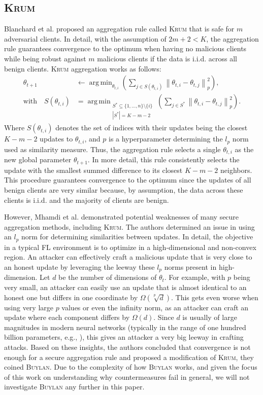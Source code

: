 \documentclass[conference]{IEEEtran}
\DeclareMathOperator*{\argmin}{arg\,min}
\newcommand{\norm}[1]{\left\lVert#1\right\rVert}
\begin{document}
\subsection{\textsc{Krum}}
Blanchard et al. \cite{Blanchard2017} proposed an aggregation rule called \textsc{Krum} that is safe for $m$ adversarial clients. In detail, with the assumption of $2m +2 < K$, the aggregation rule guarantees convergence to the optimum when having no malicious clients while being robust against $m$ malicious clients if the data is i.i.d. across all benign clients.
\textsc{Krum} aggregation works as follows:
\begin{align}
    \theta_{t+1} &\leftarrow \argmin_{\theta_{t,i}}(\sum_{j\in S(\theta_{t,i})}\norm{\theta_{t,i} - \theta_{t,j}}^2_p), \\
    \text{with} \quad S(\theta_{t,i}) &= \argmin_{\substack{S^* \subseteq \{1, \ldots, n\} \setminus \{i\}\\|S^*| = K-m-2}}(\sum_{j\in S^*}\norm{\theta_{t,i} - \theta_{t,j}}^2_p). \nonumber
\end{align}
Where $S(\theta_{t,i})$ denotes the set of indices with their updates being the closest $K-m-2$ updates to $\theta_{t,i}$, and $p$ is a hyperparameter determining the $l_p$ norm used as similarity measure. Thus, the aggregation rule selects a single $\theta_{t,i}$ as the new global parameter $\theta_{t+1}$. In more detail, this rule consistently selects the update with the smallest summed difference to its closest $K-m-2$ neighbors. This procedure guarantees convergence to the optimum since the updates of all benign clients are very similar because, by assumption, the data across these clients is i.i.d. and the majority of clients are benign.

However, Mhamdi et al. \cite{Mhamdi2018} demonstrated potential weaknesses of many secure aggregation methods, including \textsc{Krum}. The authors determined an issue in using an $l_p$ norm for determining similarities between updates. In detail, the objective in a typical FL environment is to optimize in a high-dimensional and non-convex region. An attacker can effectively craft a malicious update that is very close to an honest update by leveraging the leeway these $l_p$ norms present in high-dimension. Let $d$ be the number of dimensions of $\theta_{t}$. For example, with $p$ being very small, an attacker can easily use an update that is almost identical to an honest one but differs in one coordinate by $\Omega(\sqrt[p]{d})$. This gets even worse when using very large $p$ values or even the infinity norm, as an attacker can craft an update where each component differs by $\Omega(d)$. Since $d$ is usually of large magnitudes in modern neural networks (typically in the range of one hundred billion parameters, e.g., \cite{Trask2015}), this gives an attacker a very big leeway in crafting attacks. Based on these insights, the authors concluded that convergence is not enough for a secure aggregation rule and proposed a modification of \textsc{Krum}, they coined \textsc{Buylan}. Due to the complexity of how \textsc{Buylan} works, and given the focus of this work on understanding why countermeasures fail in general, we will not investigate \textsc{Buylan} any further in this paper.
\end{document}
